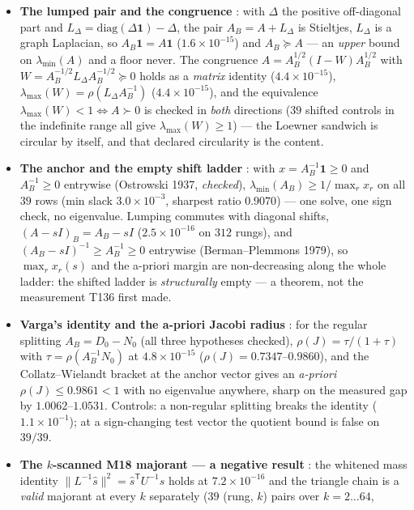 \documentclass[11pt,a4paper]{article}
\begin{document}
\begin{itemize}[leftmargin=1.5em]
\item \textbf{The lumped pair and the congruence} \mE: with $\Delta$ the positive off-diagonal part
and $L_\Delta=\mathrm{diag}(\Delta\mathbf 1)-\Delta$, the pair $A_B=A+L_\Delta$ is Stieltjes,
$L_\Delta$ is a graph Laplacian, so $A_B\mathbf 1=A\mathbf 1$ ($1.6\times10^{-15}$) and
$A_B\succeq A$ --- an \emph{upper} bound on $\lambda_{\min}(A)$ and a floor never. The congruence
$A=A_B^{1/2}(I-W)A_B^{1/2}$ with $W=A_B^{-1/2}L_\Delta A_B^{-1/2}\succeq0$ holds as a \emph{matrix}
identity ($4.4\times10^{-15}$), $\lambda_{\max}(W)=\rho(L_\Delta A_B^{-1})$ ($4.4\times10^{-15}$),
and the equivalence $\lambda_{\max}(W)<1\iff A\succ0$ is checked in \emph{both} directions ($39$
shifted controls in the indefinite range all give $\lambda_{\max}(W)\ge1$) --- the Loewner sandwich is
circular by itself, and that declared circularity is the content.
\item \textbf{The anchor and the empty shift ladder} \mE: with $x=A_B^{-1}\mathbf 1\ge0$ and
$A_B^{-1}\ge0$ entrywise (Ostrowski 1937, \emph{checked}), $\lambda_{\min}(A_B)\ge1/\max_r x_r$ on
all $39$ rows (min slack $3.0\times10^{-3}$, sharpest ratio $0.9070$) --- one solve, one sign check,
no eigenvalue. Lumping commutes with diagonal shifts, $(A-sI)_B=A_B-sI$ ($2.5\times10^{-16}$ on $312$
rungs), and $(A_B-sI)^{-1}\ge A_B^{-1}\ge0$ entrywise (Berman--Plemmons 1979), so $\max_r x_r(s)$ and
the a-priori margin are non-decreasing along the whole ladder: the shifted ladder is
\emph{structurally} empty --- a theorem, not the measurement T136 first made.
\item \textbf{Varga's identity and the a-priori Jacobi radius} \mE: for the regular splitting
$A_B=D_0-N_0$ (all three hypotheses checked), $\rho(J)=\tau/(1+\tau)$ with $\tau=\rho(A_B^{-1}N_0)$ at
$4.8\times10^{-15}$ ($\rho(J)=0.7347$--$0.9860$), and the Collatz--Wielandt bracket at the anchor
vector gives an \emph{a-priori} $\rho(J)\le0.9861<1$ with no eigenvalue anywhere, sharp on the
measured gap by $1.0062$--$1.0531$. Controls: a non-regular splitting breaks the identity
($1.1\times10^{-1}$); at a sign-changing test vector the quotient bound is false on $39/39$.
\item \textbf{The $k$-scanned M18 majorant --- a negative result} \mX: the whitened mass identity
$\|L^{-1}\hat s\|^2=\hat s^{\mathsf T}U^{-1}\hat s$ holds at $7.2\times10^{-16}$ and the triangle
chain is a \emph{valid} majorant at every $k$ separately ($39$ (rung, $k$) pairs over $k=2\ldots64$,

\end{itemize}
\end{document}
